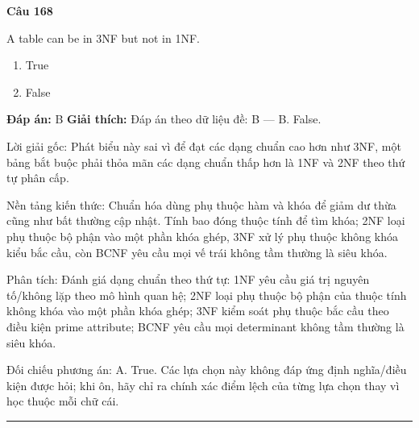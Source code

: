 \documentclass[11pt,a4paper]{article}
\newenvironment{question}[1]{%
  \par\vspace{1em}\noindent\textbf{\large Câu #1}\par\vspace{0.4em}
}{%
  \par\vspace{1em}\hrule\vspace{0.6em}
}
\newenvironment{choices}{%
  \begin{enumerate}[label=\textbf{\Alph*.},leftmargin=2.2em,itemsep=2pt,topsep=3pt]
}{%
  \end{enumerate}
}
\newcommand{\choice}{\item}
\begin{document}
\begin{question}{168}
A table can be in 3NF but not in 1NF.
\begin{choices}
\choice True
\choice False
\end{choices}
\textbf{Đáp án:} B
\textbf{Giải thích:} Đáp án theo dữ liệu đề: B — B. False.

Lời giải gốc: Phát biểu này sai vì để đạt các dạng chuẩn cao hơn như 3NF, một bảng bắt buộc phải thỏa mãn các dạng chuẩn thấp hơn là 1NF và 2NF theo thứ tự phân cấp.

Nền tảng kiến thức: Chuẩn hóa dùng phụ thuộc hàm và khóa để giảm dư thừa cũng như bất thường cập nhật. Tính bao đóng thuộc tính để tìm khóa; 2NF loại phụ thuộc bộ phận vào một phần khóa ghép, 3NF xử lý phụ thuộc không khóa kiểu bắc cầu, còn BCNF yêu cầu mọi vế trái không tầm thường là siêu khóa.

Phân tích: Đánh giá dạng chuẩn theo thứ tự: 1NF yêu cầu giá trị nguyên tố/không lặp theo mô hình quan hệ; 2NF loại phụ thuộc bộ phận của thuộc tính không khóa vào một phần khóa ghép; 3NF kiểm soát phụ thuộc bắc cầu theo điều kiện prime attribute; BCNF yêu cầu mọi determinant không tầm thường là siêu khóa.

Đối chiếu phương án: A. True. Các lựa chọn này không đáp ứng định nghĩa/điều kiện được hỏi; khi ôn, hãy chỉ ra chính xác điểm lệch của từng lựa chọn thay vì học thuộc mỗi chữ cái.
\end{question}
\end{document}

